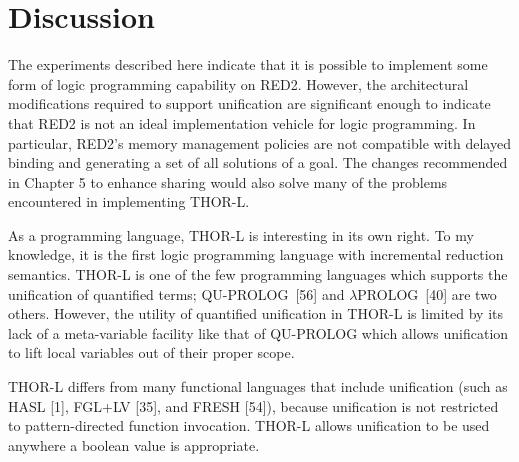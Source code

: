 \section{Discussion}

The experiments described here indicate that it is possible to implement some
form of logic programming capability on RED2. However, the architectural
modifications required to support unification are significant enough to indicate
that RED2 is not an ideal implementation vehicle for logic programming. In
particular, RED2's memory management policies are not compatible with delayed
binding and generating a set of all solutions of a goal. The changes
recommended in Chapter 5 to enhance sharing would also solve many of the
problems encountered in implementing THOR-L.

As a programming language, THOR-L is interesting in its own right. To my
knowledge, it is the first logic programming language with incremental reduction
semantics. THOR-L is one of the few programming languages which supports the
unification of quantified terms; QU-PROLOG~[56] and \(\lambda\)PROLOG~[40] are
two others. However, the utility of quantified unification in THOR-L is limited
by its lack of a meta-variable facility like that of QU-PROLOG which allows
unification to lift local variables out of their proper scope.

THOR-L differs from many functional languages that include unification (such as
HASL [1], FGL+LV [35], and FRESH [54]), because unification is not restricted to
pattern-directed function invocation. THOR-L allows unification to be used
anywhere a boolean value is appropriate.
